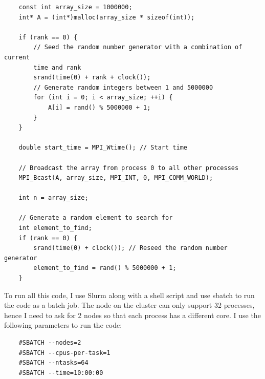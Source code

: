 \documentclass[12pt]{article}
\begin{document}
\begin{verbatim}
    const int array_size = 1000000;
    int* A = (int*)malloc(array_size * sizeof(int));

    if (rank == 0) {
        // Seed the random number generator with a combination of current 
        time and rank
        srand(time(0) + rank + clock());
        // Generate random integers between 1 and 5000000
        for (int i = 0; i < array_size; ++i) {
            A[i] = rand() % 5000000 + 1;
        }
    }

    double start_time = MPI_Wtime(); // Start time

    // Broadcast the array from process 0 to all other processes
    MPI_Bcast(A, array_size, MPI_INT, 0, MPI_COMM_WORLD);

    int n = array_size;

    // Generate a random element to search for
    int element_to_find;
    if (rank == 0) {
        srand(time(0) + clock()); // Reseed the random number generator
        element_to_find = rand() % 5000000 + 1;
    }
\end{verbatim}

To run all this code, I use Slurm along with a shell script and use sbatch to run the code as a batch job. The node on the cluster can only support 32 processes, hence I need to ask for 2 nodes so that each process has a different core. I use the following parameters to run the code:
\begin{verbatim}
    #SBATCH --nodes=2
    #SBATCH --cpus-per-task=1
    #SBATCH --ntasks=64
    #SBATCH --time=10:00:00
\end{verbatim}
\end{document}

